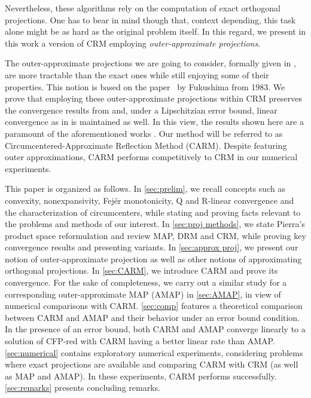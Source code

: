\documentclass[smallextended,numbook,nospthms]{svjour3}
\theoremstyle{plain}
\theoremstyle{definition}
\begin{document}
Nevertheless, these algorithms rely on the computation of exact orthogonal projections. One has to bear in mind though that, context depending, this task alone might be as hard as the original problem itself. In this regard, we present in this work a version of CRM employing \emph{outer-approximate projections}. 

The outer-approximate projections we are going to consider, formally given in , are more tractable than the exact ones while still enjoying some of their properties. This notion is based on the paper~\cite{Fukushima:1983} by Fukushima from 1983.  We prove that employing these outer-approximate projections within CRM preserves the convergence results from \cite{Behling:2020} and, under a Lipschitzian error bound, linear convergence as in \cite{Arefidamghani:2020} is maintained as well. In this view, the results shown here are a paramount of the aforementioned works \cite{Behling:2020, Arefidamghani:2020}. Our method will be referred to as Circumcentered-Approximate Reflection Method (CARM). Despite featuring outer approximations,  CARM performs competitively to CRM in our numerical experiments. 

This paper is organized as follows. In \cref{sec:prelim}, we recall concepts such as convexity, nonexpansivity, Fejér monotonicity, Q and R-linear convergence and the characterization of circumcenters, while stating and proving facts relevant to the problems and methods of our interest. In \cref{sec:proj methods}, we state Pierra's product space reformulation and review MAP, DRM and CRM, while proving key convergence results and presenting variants. In \cref{sec:approx proj}, we present our notion of outer-approximate projection as well as other notions of approximating orthogonal projections. In \cref{sec:CARM}, we introduce CARM and prove its convergence. For the sake of completeness, we carry out a similar study for a corresponding outer-approximate MAP (AMAP) in \cref{sec:AMAP}, in view of numerical comparisons with CARM. \cref{sec:comp} features a theoretical comparison between CARM and AMAP and their behavior under an error bound condition. In the presence of an error bound, both CARM and AMAP converge linearly to a solution of CFP-red with CARM having a better linear rate than AMAP. \cref{sec:numerical} contains exploratory numerical experiments, considering problems where exact projections are available and comparing CARM with CRM (as well as MAP and AMAP). In these experiments, CARM performs successfully. \cref{sec:remarks} presents concluding remarks.
\end{document}
